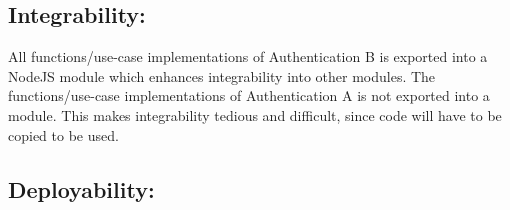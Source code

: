 \subsection{Integrability:}
All functions/use-case implementations of Authentication B is exported into a NodeJS module which enhances integrability into other modules.
The functions/use-case implementations of Authentication A is not exported into a module. This makes integrability tedious and difficult, since code will have to be copied to be used.

\subsection{Deployability:}